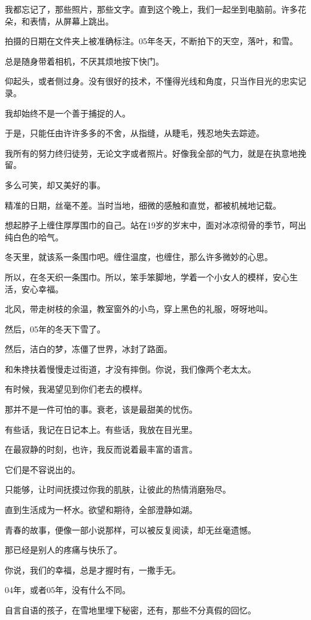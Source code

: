 \documentclass[12pt,a4paper]{article}
\begin{document}
		我都忘记了，那些照片，那些文字。直到这个晚上，我们一起坐到电脑前。许多花朵，和表情，从屏幕上跳出。

		拍摄的日期在文件夹上被准确标注。05年冬天，不断拍下的天空，落叶，和雪。\par
		总是随身带着相机，不厌其烦地按下快门。\par
		仰起头，或者侧过身。没有很好的技术，不懂得光线和角度，只当作目光的忠实记录。

		我却始终不是一个善于捕捉的人。

		于是，只能任由许许多多的不舍，从指缝，从睫毛，残忍地失去踪迹。

		我所有的努力终归徒劳，无论文字或者照片。好像我全部的气力，就是在执意地挽留。\par
		多么可笑，却又美好的事。

		精准的日期，丝毫不差。当时当地，细微的感触和直觉，都被机械地记载。

		想起脖子上缠住厚厚围巾的自己。站在19岁的岁末中，面对冰凉彻骨的季节，呵出纯白色的哈气。

		冬天里，就该系一条围巾吧。缠住温度，也缠住，那么许多微妙的心思。\par
		所以，在冬天织一条围巾。所以，笨手笨脚地，学着一个小女人的模样，安心生活，安心幸福。

		北风，带走树枝的余温，教室窗外的小鸟，穿上黑色的礼服，呀呀地叫。

		然后，05年的冬天下雪了。\par
		然后，洁白的梦，冻僵了世界，冰封了路面。

		和朱搀扶着慢慢走过街道，才没有摔倒。你说，我们像两个老太太。\par
		有时候，我渴望见到你们老去的模样。\par
		那并不是一件可怕的事。衰老，该是最甜美的忧伤。

		有些话，我记在日记本上。有些话，我放在目光里。\par
		在最寂静的时刻，也许，我反而说着最丰富的语言。

		它们是不容说出的。

		只能够，让时间抚摸过你我的肌肤，让彼此的热情消磨殆尽。\par
		直到生活成为一杯水。欲望和期待，全部澄静如湖。\par
		青春的故事，便像一部小说那样，可以被反复阅读，却无丝毫遗憾。\par
		那已经是别人的疼痛与快乐了。

		你说，我们的幸福，总是才握时有，一撒手无。\par
		04年，或者05年，没有什么不同。\par
		自言自语的孩子，在雪地里埋下秘密，还有，那些不分真假的回忆。
\end{document}
